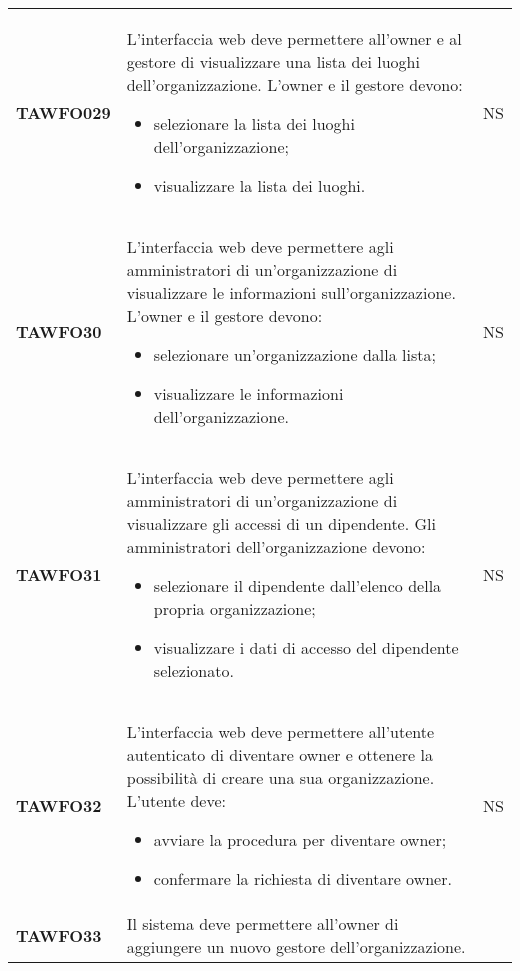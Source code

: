 \documentclass[../piano-di-qualifica.tex]{subfiles}
\begin{document}
\begin{centering}
\begin{longtable}[H]{>{\centering\bfseries}m{3cm} >{}p{10cm} >{\centering\arraybackslash}m{3cm}}
        TAWFO029      & L’interfaccia web deve permettere all’owner e al gestore di visualizzare una lista dei luoghi dell’organizzazione. \newline
        L’owner e il gestore devono:
        \begin{itemize}
         \item selezionare la lista dei luoghi dell'organizzazione;
         \item visualizzare la lista dei luoghi.
        \end{itemize}
        & NS \\
        TAWFO30      & L’interfaccia web deve permettere agli amministratori di un’organizzazione di visualizzare le informazioni sull’organizzazione. \newline
        L’owner e il gestore devono:
        \begin{itemize}
         \item selezionare un'organizzazione dalla lista;
         \item visualizzare le informazioni dell'organizzazione.
        \end{itemize}
        & NS \\
        TAWFO31      & L’interfaccia web deve permettere agli amministratori di un’organizzazione di visualizzare gli accessi di un dipendente. \newline
        Gli amministratori dell'organizzazione devono:
        \begin{itemize}
         \item selezionare il dipendente dall'elenco della propria organizzazione;
         \item visualizzare i dati di accesso del dipendente selezionato.
        \end{itemize}
        & NS \\
        TAWFO32      & L’interfaccia web deve permettere all’utente autenticato di diventare owner e ottenere la possibilità di creare una sua organizzazione. \newline
        L'utente deve:
        \begin{itemize}
         \item avviare la procedura per diventare owner;
         \item confermare la richiesta di diventare owner.
        \end{itemize}
        & NS \\
        TAWFO33      & Il sistema deve permettere all’owner di aggiungere un nuovo gestore dell’organizzazione.    \newline

\end{longtable}
\end{centering}
\end{document}

